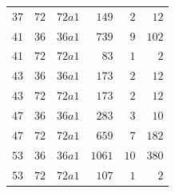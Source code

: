 \documentclass[11pt, a4paper]{amsart}
\theoremstyle{definition}
\begin{document}
\begin{table}[htbp]
\begin{tabular}{@{}rllrrr@{}}
$37$ & $72$ & $72a1$                        & $149$  & $2$  & $12$ \\
$41$ & $36$ & $36a1$                        & $739$  & $9$  & $102$ \\
$41$ & $72$ & $72a1$                        & $83$   & $1$  & $2$ \\
$43$ & $36$ & $36a1$                        & $173$  & $2$  & $12$ \\
$43$ & $72$ & $72a1$                        & $173$  & $2$  & $12$ \\
$47$ & $36$ & $36a1$                        & $283$  & $3$  & $10$ \\
$47$ & $72$ & $72a1$                        & $659$  & $7$  & $182$ \\
$53$ & $36$ & $36a1$                        & $1061$ & $10$ & $380$ \\
$53$ & $72$ & $72a1$                        & $107$  & $1$  & $2$ \\
\bottomrule
\end{tabular}
\end{table}
\end{document}
